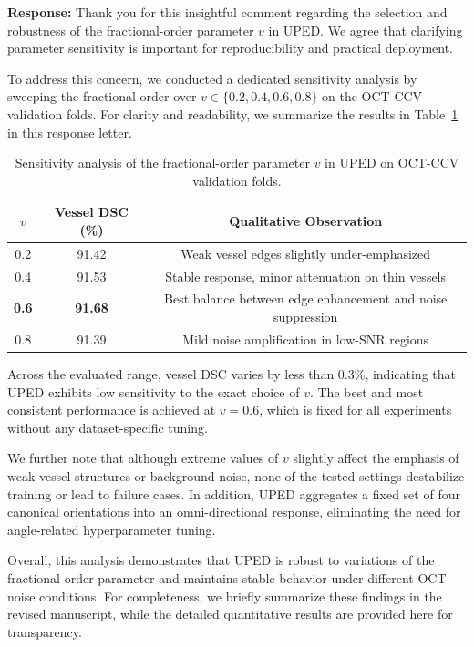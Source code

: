 \documentclass[11pt]{article}
\newcommand{\commentresponse}[2]{{\color{blue}\textbf{Response:} #2}}
\begin{document}
\begin{enumerate}
    \commentresponse{3}{
    Thank you for this insightful comment regarding the selection and robustness of the fractional-order parameter $v$ in UPED. We agree that clarifying parameter sensitivity is important for reproducibility and practical deployment.

    To address this concern, we conducted a dedicated sensitivity analysis by sweeping the fractional order over $v\in\{0.2,0.4,0.6,0.8\}$ on the OCT-CCV validation folds. For clarity and readability, we summarize the results in Table~\ref{tab:v_sensitivity} in this response letter.
    
    \begin{table}[h]
    \centering
    \caption{Sensitivity analysis of the fractional-order parameter $v$ in UPED on OCT-CCV validation folds.}
    \label{tab:v_sensitivity}
    \begin{tabular}{c c c}
    \hline
    $v$ & Vessel DSC (\%) & Qualitative Observation \\
    \hline
    0.2 & 91.42 & Weak vessel edges slightly under-emphasized \\
    0.4 & 91.53 & Stable response, minor attenuation on thin vessels \\
    \textbf{0.6} & \textbf{91.68} & Best balance between edge enhancement and noise suppression \\
    0.8 & 91.39 & Mild noise amplification in low-SNR regions \\
    \hline
    \end{tabular}
    \end{table}
    
    Across the evaluated range, vessel DSC varies by less than 0.3\%, indicating that UPED exhibits low sensitivity to the exact choice of $v$. The best and most consistent performance is achieved at $v=0.6$, which is fixed for all experiments without any dataset-specific tuning.
    
    We further note that although extreme values of $v$ slightly affect the emphasis of weak vessel structures or background noise, none of the tested settings destabilize training or lead to failure cases. In addition, UPED aggregates a fixed set of four canonical orientations into an omni-directional response, eliminating the need for angle-related hyperparameter tuning.
    
    Overall, this analysis demonstrates that UPED is robust to variations of the fractional-order parameter and maintains stable behavior under different OCT noise conditions. For completeness, we briefly summarize these findings in the revised manuscript, while the detailed quantitative results are provided here for transparency.

}
\end{enumerate}
\end{document}
